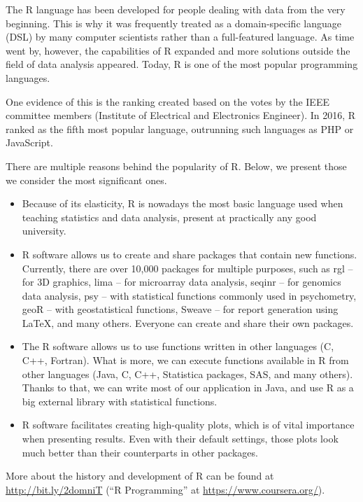 \documentclass[]{book}
\theoremstyle{definition}
\theoremstyle{definition}
\theoremstyle{definition}
\theoremstyle{remark}
\begin{document}
The R language has been developed for people dealing with data from the
very beginning. This is why it was frequently treated as a
domain-specific language (DSL) by many computer scientists rather than a
full-featured language. As time went by, however, the capabilities of R
expanded and more solutions outside the field of data analysis appeared.
Today, R is one of the most popular programming languages.

One evidence of this is the ranking created based on the votes by the
IEEE committee members (Institute of Electrical and Electronics
Engineer). In 2016, R ranked as the fifth most popular language,
outrunning such languages as PHP or JavaScript.

There are multiple reasons behind the popularity of R. Below, we present
those we consider the most significant ones.

\begin{itemize}
\item
  Because of its elasticity, R is nowadays the most basic language used
  when teaching statistics and data analysis, present at practically any
  good university.
\item
  R software allows us to create and share packages that contain new
  functions. Currently, there are over 10,000 packages for multiple
  purposes, such as rgl -- for 3D graphics, lima -- for microarray data
  analysis, seqinr -- for genomics data analysis, psy -- with
  statistical functions commonly used in psychometry, geoR -- with
  geostatistical functions, Sweave -- for report generation using LaTeX,
  and many others. Everyone can create and share their own packages.
\item
  The R software allows us to use functions written in other languages
  (C, C++, Fortran). What is more, we can execute functions available in
  R from other languages (Java, C, C++, Statistica packages, SAS, and
  many others). Thanks to that, we can write most of our application in
  Java, and use R as a big external library with statistical functions.
\item
  R software facilitates creating high-quality plots, which is of vital
  importance when presenting results. Even with their default settings,
  those plots look much better than their counterparts in other
  packages.
\end{itemize}

More about the history and development of R can be found at
\url{http://bit.ly/2domniT} (``R Programming'' at
\url{https://www.coursera.org/}).
\end{document}
